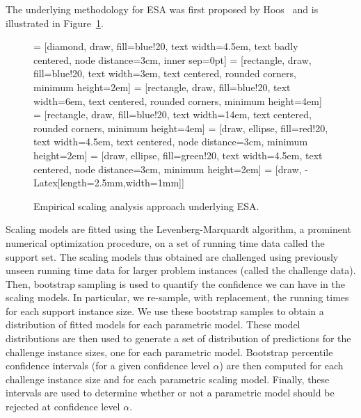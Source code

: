 \documentclass[aic]{iosart2x}
\begin{document}
The underlying methodology for ESA was first proposed by Hoos~\cite{Hoo09}
and is illustrated in Figure~\ref{fig:methodology}.
\begin{figure}[t]
\noindent \centering{} = [diamond, draw, fill=blue!20, text width=4.5em, text badly centered, node distance=3cm, inner sep=0pt]
 = [rectangle, draw, fill=blue!20, text width=3em, text centered, rounded corners, minimum height=2em]
 = [rectangle, draw, fill=blue!20, text width=6em, text centered, rounded corners, minimum height=4em]
 = [rectangle, draw, fill=blue!20, text width=14em, text centered, rounded corners, minimum height=4em]
 = [draw, ellipse, fill=red!20, text width=4.5em, text centered, node distance=3cm, minimum height=2em]
 = [draw, ellipse, fill=green!20, text width=4.5em, text centered, node distance=3cm, minimum height=2em]
 = [draw, -{Latex[length=2.5mm,width=1mm]}]

\caption{Empirical scaling analysis approach underlying ESA.}\label{fig:methodology}
\end{figure}
Scaling models are fitted using the Levenberg-Marquardt algorithm, a prominent numerical optimization procedure,
on a set of running time data called the support set. The scaling models thus obtained are challenged using previously unseen running time data for larger problem instances (called the challenge data). Then, bootstrap sampling is used to quantify the confidence we can have in the scaling models. In particular, we re-sample, with replacement, the running times for each support instance size. We use these bootstrap samples to obtain a distribution of fitted models for each parametric model. These model distributions are then used to generate a set of distribution of predictions for the challenge instance sizes, one for each parametric model. Bootstrap percentile confidence intervals (for a given confidence level $\alpha$) are then computed for each challenge instance size and for each parametric scaling model. Finally, these intervals are used to determine whether or not a parametric model should be rejected at confidence level $\alpha$.
\end{document}

